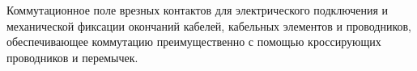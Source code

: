 Коммутационное поле врезных контактов для электрического 
подключения и механической фиксации окончаний кабелей,
кабельных элементов и проводников, обеспечивающее
коммутацию преимущественно с помощью кроссирующих проводников
и перемычек.